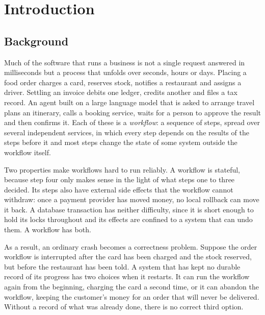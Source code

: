 \clearpage
\chapter{Introduction}

\section{Background}

Much of the software that runs a business is not a single request answered in
milliseconds but a process that unfolds over seconds, hours or days. Placing a
food order charges a card, reserves stock, notifies a restaurant and assigns a
driver. Settling an invoice debits one ledger, credits another and files a tax
record. An agent built on a large language model that is asked to arrange
travel plans an itinerary, calls a booking service, waits for a person to
approve the result and then confirms it. Each of these is a \emph{workflow}: a
sequence of steps, spread over several independent services, in which every
step depends on the results of the steps before it and most steps change the
state of some system outside the workflow itself.

Two properties make workflows hard to run reliably. A workflow is stateful,
because step four only makes sense in the light of what steps one to three
decided. Its steps also have external side effects that the workflow cannot
withdraw: once a payment provider has moved money, no local rollback can move
it back. A database transaction has neither difficulty, since it is short
enough to hold its locks throughout and its effects are confined to a system
that can undo them. A workflow has both.

As a result, an ordinary crash becomes a correctness problem. Suppose the
order workflow is interrupted after the card has been charged and the stock
reserved, but before the restaurant has been told. A system that has kept no
durable record of its progress has two choices when it restarts. It can run
the workflow again from the beginning, charging the card a second time, or it
can abandon the workflow, keeping the customer's money for an order that will
never be delivered. Without a record of what was already done, there is no
correct third option.

